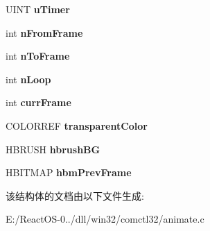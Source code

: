 \begin{DoxyCompactItemize}
\mbox{\label{struct_a_n_i_m_a_t_e___i_n_f_o_a1324382784e0845233acf49a6b9be287}} 
U\+I\+NT {\bfseries u\+Timer}
\item 
\mbox{\label{struct_a_n_i_m_a_t_e___i_n_f_o_afec54db69f09485e01d732156f629e3a}} 
int {\bfseries n\+From\+Frame}
\item 
\mbox{\label{struct_a_n_i_m_a_t_e___i_n_f_o_a91e6e621ac73f19ac1fbba769f840250}} 
int {\bfseries n\+To\+Frame}
\item 
\mbox{\label{struct_a_n_i_m_a_t_e___i_n_f_o_a5e49d71feef3d92bce4790dcffeed62c}} 
int {\bfseries n\+Loop}
\item 
\mbox{\label{struct_a_n_i_m_a_t_e___i_n_f_o_aa41190d296ff9717008766701465f6dd}} 
int {\bfseries curr\+Frame}
\item 
\mbox{\label{struct_a_n_i_m_a_t_e___i_n_f_o_aaa6a54b1c80203fd29e10500f4d9be10}} 
C\+O\+L\+O\+R\+R\+EF {\bfseries transparent\+Color}
\item 
\mbox{\label{struct_a_n_i_m_a_t_e___i_n_f_o_a14b6a05c77a24273e0ecdb15105b1625}} 
H\+B\+R\+U\+SH {\bfseries hbrush\+BG}
\item 
\mbox{\label{struct_a_n_i_m_a_t_e___i_n_f_o_acfbcc77fec3212b7840f1166d63f2271}} 
H\+B\+I\+T\+M\+AP {\bfseries hbm\+Prev\+Frame}
\end{DoxyCompactItemize}


该结构体的文档由以下文件生成\+:\begin{DoxyCompactItemize}
\item 
E\+:/\+React\+O\+S-\/0../dll/win32/comctl32/animate.\+c\end{DoxyCompactItemize}
